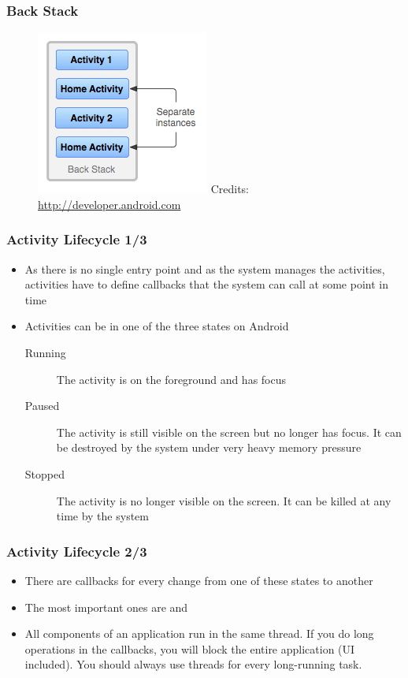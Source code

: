 \begin{frame}
  \frametitle{Back Stack}
  \begin{figure}[h!]
    \centering
    \includegraphics[height=0.65\textheight]{slides/android-application-activities/activity-backstack-instances.png}
    {
      \tiny
      Credits: \url{http://developer.android.com}
    }
  \end{figure}
\end{frame}

\begin{frame}
  \frametitle{Activity Lifecycle 1/3}
  \begin{itemize}
  \item As there is no single entry point and as the system manages
    the activities, activities have to define callbacks that the
    system can call at some point in time
  \item Activities can be in one of the three states on Android
    \begin{description}
    \item[Running] The activity is on the foreground and has focus
    \item[Paused] The activity is still visible on the screen but no
      longer has focus. It can be destroyed by the system under very
      heavy memory pressure
    \item[Stopped] The activity is no longer visible on the screen. It
      can be killed at any time by the system
    \end{description}
  \end{itemize}
\end{frame}

\begin{frame}
  \frametitle{Activity Lifecycle 2/3}
  \begin{itemize}
  \item There are callbacks for every change from one of these states
    to another
  \item The most important ones are  and 
  \item All components of an application run in the same thread. If
    you do long operations in the callbacks, you will block the entire
    application (UI included). You should always use threads for every
    long-running task.
  \end{itemize}
\end{frame}

